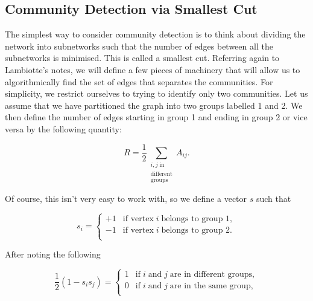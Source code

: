 


\subsection{Community Detection via Smallest Cut}\label{sec:smallest_cut}
The simplest way to consider community detection is to think about dividing the network into subnetworks such that the number of edges between all the subnetworks is minimised. This is called a smallest cut. Referring again to Lambiotte's notes, we will define a few pieces of machinery that will allow us to algorithmically find the set of edges that separates the communities.\cite[26-27]{oxford:renaud_notes} For simplicity, we restrict ourselves to trying to identify only two communities. Let us assume that we have partitioned the graph into two groups labelled 1 and 2. We then define the number of edges starting in group 1 and ending in group 2 or vice versa by the following quantity:

$$ R = \frac{1}{2} \sum_{\substack{i, j \; \text{in} \\ \text{different} \\ \text{groups}}} A_{ij}. $$

Of course, this isn't very easy to work with, so we define a vector $s$ such that

$$ s_i = 
\begin{cases}
    +1 & \text{if vertex} \; i \; \text{belongs to group 1}, \\
    -1 & \text{if vertex} \; i \; \text{belongs to group 2}. \\
\end{cases}
$$

After noting the following

$$ \frac{1}{2}(1 - s_i s_j) = 
\begin{cases}
    1 & \text{if} \; i \; \text{and} \; j \; \text{are in different groups}, \\
    0 & \text{if} \; i \; \text{and} \; j \; \text{are in the same group}, \\
\end{cases}
$$

